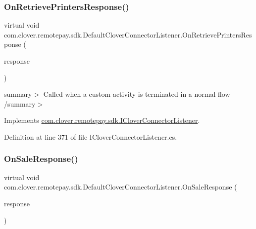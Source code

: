 \subsubsection{\texorpdfstring{On\+Retrieve\+Printers\+Response()}{OnRetrievePrintersResponse()}}
{\footnotesize\ttfamily virtual void com.\+clover.\+remotepay.\+sdk.\+Default\+Clover\+Connector\+Listener.\+On\+Retrieve\+Printers\+Response (\begin{DoxyParamCaption}\item[{\hyperlink{classcom_1_1clover_1_1remotepay_1_1sdk_1_1_retrieve_printers_response}{Retrieve\+Printers\+Response}}]{response }\end{DoxyParamCaption})\hspace{0.3cm}{\ttfamily [virtual]}}

summary$>$ Called when a custom activity is terminated in a normal flow /summary$>$ 

Implements \hyperlink{interfacecom_1_1clover_1_1remotepay_1_1sdk_1_1_i_clover_connector_listener_ad140361fb09060287f6fde7e5ff79c2c}{com.\+clover.\+remotepay.\+sdk.\+I\+Clover\+Connector\+Listener}.



Definition at line 371 of file I\+Clover\+Connector\+Listener.\+cs.

\mbox{\label{classcom_1_1clover_1_1remotepay_1_1sdk_1_1_default_clover_connector_listener_a1a562a3f2e2f786ada3beeeec083fe83}} 
\subsubsection{\texorpdfstring{On\+Sale\+Response()}{OnSaleResponse()}}
{\footnotesize\ttfamily virtual void com.\+clover.\+remotepay.\+sdk.\+Default\+Clover\+Connector\+Listener.\+On\+Sale\+Response (\begin{DoxyParamCaption}\item[{\hyperlink{classcom_1_1clover_1_1remotepay_1_1sdk_1_1_sale_response}{Sale\+Response}}]{response }\end{DoxyParamCaption})\hspace{0.3cm}{\ttfamily [virtual]}}



